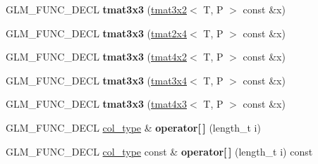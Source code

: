 \begin{DoxyCompactItemize}
\item 
G\+L\+M\+\_\+\+F\+U\+N\+C\+\_\+\+D\+E\+CL {\bfseries tmat3x3} (\hyperlink{structglm_1_1detail_1_1tmat3x2}{tmat3x2}$<$ T, P $>$ const \&x)\hypertarget{structglm_1_1detail_1_1tmat3x3_ad518c170d44ccf4b1d2d92559a2769b6}{}\label{structglm_1_1detail_1_1tmat3x3_ad518c170d44ccf4b1d2d92559a2769b6}

\item 
G\+L\+M\+\_\+\+F\+U\+N\+C\+\_\+\+D\+E\+CL {\bfseries tmat3x3} (\hyperlink{structglm_1_1detail_1_1tmat2x4}{tmat2x4}$<$ T, P $>$ const \&x)\hypertarget{structglm_1_1detail_1_1tmat3x3_a98fab3111797488d43d13de3b9c34db9}{}\label{structglm_1_1detail_1_1tmat3x3_a98fab3111797488d43d13de3b9c34db9}

\item 
G\+L\+M\+\_\+\+F\+U\+N\+C\+\_\+\+D\+E\+CL {\bfseries tmat3x3} (\hyperlink{structglm_1_1detail_1_1tmat4x2}{tmat4x2}$<$ T, P $>$ const \&x)\hypertarget{structglm_1_1detail_1_1tmat3x3_a727ffba03de5a02331f41858742f8d09}{}\label{structglm_1_1detail_1_1tmat3x3_a727ffba03de5a02331f41858742f8d09}

\item 
G\+L\+M\+\_\+\+F\+U\+N\+C\+\_\+\+D\+E\+CL {\bfseries tmat3x3} (\hyperlink{structglm_1_1detail_1_1tmat3x4}{tmat3x4}$<$ T, P $>$ const \&x)\hypertarget{structglm_1_1detail_1_1tmat3x3_a3c9ff04e39cb4cd6d0b4710683d7ab8c}{}\label{structglm_1_1detail_1_1tmat3x3_a3c9ff04e39cb4cd6d0b4710683d7ab8c}

\item 
G\+L\+M\+\_\+\+F\+U\+N\+C\+\_\+\+D\+E\+CL {\bfseries tmat3x3} (\hyperlink{structglm_1_1detail_1_1tmat4x3}{tmat4x3}$<$ T, P $>$ const \&x)\hypertarget{structglm_1_1detail_1_1tmat3x3_a3c3870ea513e58b0a44ca5e6abedcc71}{}\label{structglm_1_1detail_1_1tmat3x3_a3c3870ea513e58b0a44ca5e6abedcc71}

\item 
G\+L\+M\+\_\+\+F\+U\+N\+C\+\_\+\+D\+E\+CL \hyperlink{structglm_1_1detail_1_1tvec3}{col\+\_\+type} \& {\bfseries operator\mbox{[}$\,$\mbox{]}} (length\+\_\+t i)\hypertarget{structglm_1_1detail_1_1tmat3x3_ac99796f89cd590265d02f98850605043}{}\label{structglm_1_1detail_1_1tmat3x3_ac99796f89cd590265d02f98850605043}

\item 
G\+L\+M\+\_\+\+F\+U\+N\+C\+\_\+\+D\+E\+CL \hyperlink{structglm_1_1detail_1_1tvec3}{col\+\_\+type} const \& {\bfseries operator\mbox{[}$\,$\mbox{]}} (length\+\_\+t i) const \hypertarget{structglm_1_1detail_1_1tmat3x3_a404a55af6f9769133ec0631479f077b6}{}\label{structglm_1_1detail_1_1tmat3x3_a404a55af6f9769133ec0631479f077b6}


\end{DoxyCompactItemize}
